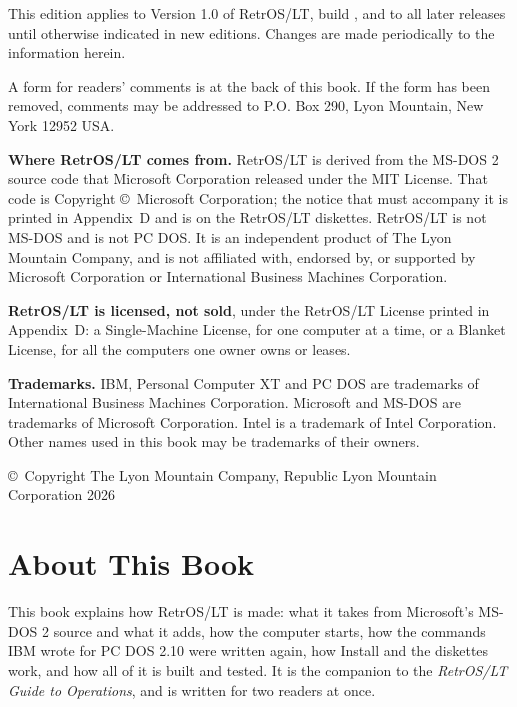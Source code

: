 \pagestyle{blank}
\vspace*{\fill}
\begin{wide}
\small
\textbf{\edition}

This edition applies to Version 1.0 of RetrOS/LT, build \release, and to
all later releases until otherwise indicated in new editions. Changes are
made periodically to the information herein. \editionchanges

A form for readers' comments is at the back of this book. If the form has
been removed, comments may be addressed to P.O. Box 290, Lyon Mountain,
New York 12952 USA.

\textbf{Where RetrOS/LT comes from.} RetrOS/LT is derived from the MS-DOS 2
source code that Microsoft Corporation released under the MIT License.
That code is Copyright \copyright\ Microsoft Corporation; the notice that
must accompany it is printed in Appendix~D and is on the RetrOS/LT
diskettes. RetrOS/LT is not MS-DOS and is not PC DOS. It is an independent
product of The Lyon Mountain Company, and is not affiliated with, endorsed
by, or supported by Microsoft Corporation or International Business
Machines Corporation.

\textbf{RetrOS/LT is licensed, not sold}, under the RetrOS/LT License
printed in Appendix~D: a Single-Machine License, for one computer at a
time, or a Blanket License, for all the computers one owner owns or
leases.

\textbf{Trademarks.} IBM, Personal Computer XT and PC DOS are trademarks
of International Business Machines Corporation. Microsoft and MS-DOS are
trademarks of Microsoft Corporation. Intel is a trademark of Intel
Corporation. Other names used in this book may be trademarks of their
owners.

\copyright\ Copyright The Lyon Mountain Company, Republic Lyon Mountain Corporation 2026
\end{wide}
\newpage

\pagestyle{plain}
\renewcommand\runningtitle{About This Book}
\chapter*{About This Book}

This book explains how RetrOS/LT is made: what it takes from Microsoft's
MS-DOS 2 source and what it adds, how the computer starts, how the
commands IBM wrote for PC DOS 2.10 were written again, how Install and the
diskettes work, and how all of it is built and tested. It is the companion
to the \textit{RetrOS/LT Guide to Operations}, and is written for two
readers at once.

